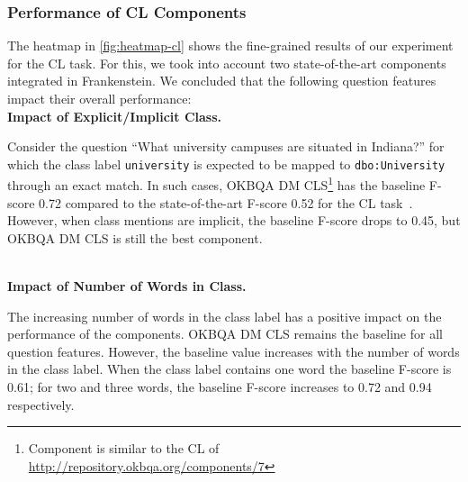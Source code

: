 \documentclass[sigconf,edbt]{acmart-edbt2019}
\newcommand{\qq}[1]{``#1''}
\begin{document}
\subsubsection{Performance of CL Components} \label{sec:clc}
The heatmap in \autoref{fig:heatmap-cl} shows the fine-grained results of our experiment for the CL task. For this, we took into account two state-of-the-art components integrated in Frankenstein. We concluded that the following question features impact their overall performance:
~\\
{\bf Impact of Explicit/Implicit Class.} \begin{inparaenum}
Consider the question \qq{What university campuses are situated in Indiana?} for which the class label \texttt{university} is expected to be mapped to \texttt{dbo:University} through an exact match. In such cases, OKBQA DM CLS\footnote{Component is similar to the CL of \url{http://repository.okbqa.org/components/7}} has the baseline F-score 0.72 compared to the state-of-the-art F-score 0.52 for the CL task~\cite{DBLP:conf/www/SinghRBSLUVKP0V18}. 
However, when class mentions are implicit, the baseline F-score drops to 0.45, but OKBQA DM CLS is still the best component. 
\end{inparaenum}
~\\
{\bf Impact of Number of Words in Class.} \begin{inparaenum}
The increasing number of words in the class label has a positive impact on the performance of the components. OKBQA DM CLS remains the baseline for all question features. However, the baseline value increases with the number of words in the class label. When the class label contains one word the baseline F-score is 0.61; for two and three words, the baseline F-score increases to 0.72 and 0.94 respectively.
\end{inparaenum}
%
%
\end{document}
